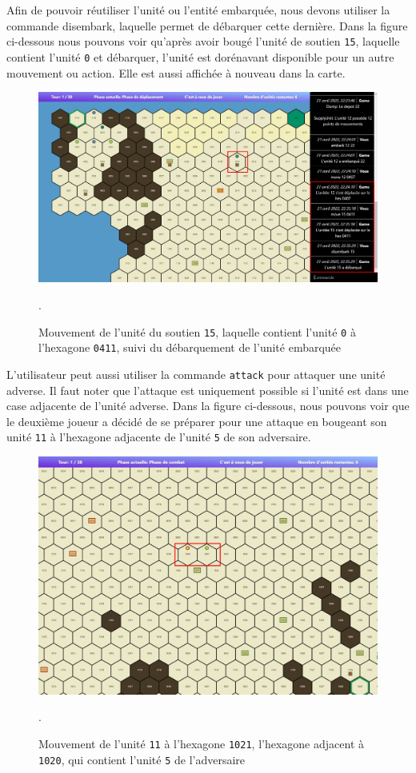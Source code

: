 Afin de pouvoir réutiliser l'unité ou l'entité embarquée, nous devons utiliser la commande disembark, laquelle permet de débarquer cette dernière.
Dans la figure ci-dessous nous pouvons voir qu'après avoir bougé l'unité de soutien {\tt 15}, laquelle contient l'unité {\tt 0} et débarquer, l'unité est dorénavant disponible pour un autre mouvement ou action. Elle est aussi affichée à nouveau dans la carte.\\

\begin{figure}[H]
    \centering
    \includegraphics[scale=0.35]{data/Disembark.jpg}
    \caption{Mouvement de l'unité du soutien \lstinline{15}, laquelle contient l'unité \lstinline{0} à l'hexagone \lstinline{0411}, suivi du débarquement de l'unité embarquée}.
\end{figure}

L'utilisateur peut aussi utiliser la commande {\tt attack} pour attaquer une unité adverse. Il faut noter que l'attaque est uniquement possible si l'unité est dans une case adjacente de l'unité adverse. Dans la figure ci-dessous, nous pouvons voir que le deuxième joueur a décidé de se préparer pour une attaque en bougeant son unité {\tt 11} à l'hexagone adjacente de l'unité {\tt 5} de son adversaire.\\

\begin{figure}[H]
    \centering
    \includegraphics[scale=0.35]{data/beforeAttack.jpg}
    \caption{Mouvement de l'unité \lstinline{11} à l'hexagone \lstinline{1021}, l'hexagone adjacent à \lstinline{1020}, qui contient l'unité \lstinline{5} de l'adversaire }.
\end{figure}

